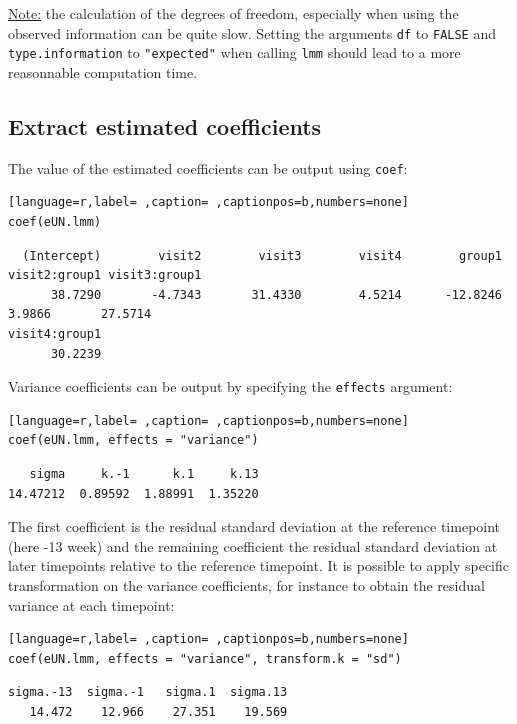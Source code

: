 \documentclass[12pt]{article}
\begin{document}
\uline{Note:} the calculation of the degrees of freedom, especially when
using the observed information can be quite slow. Setting the
arguments \texttt{df} to \texttt{FALSE} and \texttt{type.information} to \texttt{"expected"} when
calling \texttt{lmm} should lead to a more reasonnable computation time.

\subsection{Extract estimated coefficients}
\label{sec:orgd8e9cec}
The value of the estimated coefficients can be output using \texttt{coef}:
\begin{lstlisting}[language=r,label= ,caption= ,captionpos=b,numbers=none]
coef(eUN.lmm)
\end{lstlisting}

\begin{verbatim}
  (Intercept)        visit2        visit3        visit4        group1 visit2:group1 visit3:group1 
      38.7290       -4.7343       31.4330        4.5214      -12.8246        3.9866       27.5714 
visit4:group1 
      30.2239
\end{verbatim}


Variance coefficients can be output by specifying the \texttt{effects} argument:
\begin{lstlisting}[language=r,label= ,caption= ,captionpos=b,numbers=none]
coef(eUN.lmm, effects = "variance")
\end{lstlisting}

\begin{verbatim}
   sigma     k.-1      k.1     k.13 
14.47212  0.89592  1.88991  1.35220
\end{verbatim}


The first coefficient is the residual standard deviation at the
reference timepoint (here -13 week) and the remaining coefficient the
residual standard deviation at later timepoints relative to the
reference timepoint. It is possible to apply specific transformation
on the variance coefficients, for instance to obtain the residual
variance at each timepoint:
\begin{lstlisting}[language=r,label= ,caption= ,captionpos=b,numbers=none]
coef(eUN.lmm, effects = "variance", transform.k = "sd")
\end{lstlisting}

\begin{verbatim}
sigma.-13  sigma.-1   sigma.1  sigma.13 
   14.472    12.966    27.351    19.569
\end{verbatim}
\end{document}

